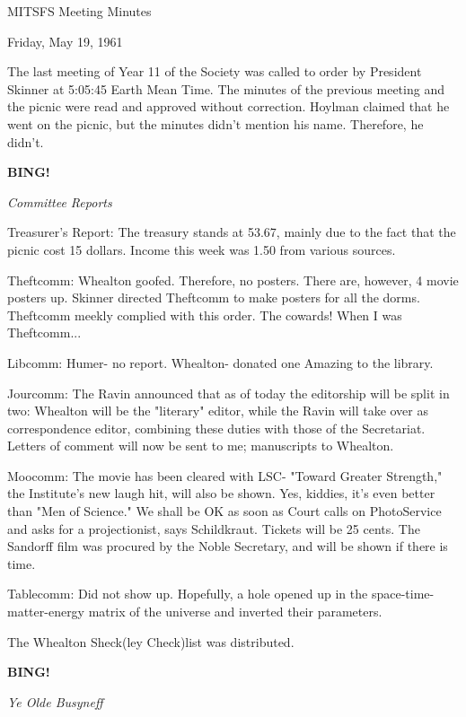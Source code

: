 \documentclass[12pt]{article}
\newcommand{\bing}{{\bf BING!} }
\newcommand{\goto}[1]{\bing \vskip 12pt \centerline{{\em{#1}}}}
\begin{document}
\begin{center}

MITSFS Meeting Minutes

Friday, May 19, 1961

\end{center}
 
\vspace{12pt}

\setlength{\parskip}{6pt}

\noindent
The last meeting of Year 11 of the Society was called to order by President Skinner at 5:05:45 Earth Mean Time. The minutes of the previous meeting and the picnic were read and approved without correction. Hoylman claimed that he went on the picnic, but the minutes didn't mention his name. Therefore, he didn't.

\goto{Committee Reports}

Treasurer's Report: The treasury stands at 53.67, mainly due to the fact that the picnic cost 15 dollars. Income this week was 1.50 from various sources.

Theftcomm: Whealton goofed. Therefore, no posters. There are, however, 4 movie posters up. Skinner directed Theftcomm to make posters for all the dorms. Theftcomm meekly complied with this order. The cowards! When I was Theftcomm...

Libcomm: Humer- no report. Whealton- donated one Amazing to the library.

Jourcomm: The Ravin announced that as of today the editorship will be split in two: Whealton will be the "literary" editor, while the Ravin will take over as correspondence editor, combining these duties with those of the Secretariat. Letters of comment will now be sent to me; manuscripts to Whealton.

Moocomm: The movie has been cleared with LSC- "Toward Greater Strength," the Institute's new laugh hit, will also be shown. Yes, kiddies, it's even better than "Men of Science." We shall be OK as soon as Court calls on PhotoService and asks for a projectionist, says Schildkraut. Tickets will be 25 cents. The Sandorff film was procured by the Noble Secretary, and will be shown if there is time.

Tablecomm: Did not show up. Hopefully, a hole opened up in the space-time-matter-energy matrix of the universe and inverted their parameters.

The Whealton Sheck(ley Check)list was distributed.

\goto{Ye Olde Busyneff}
\end{document}
